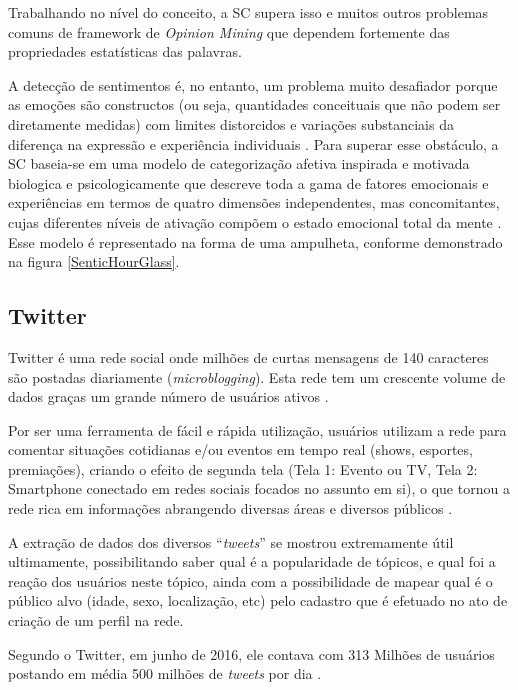 \documentclass[
	12pt,				%
	openright,			%
	oneside,			%
	a4paper,			%
	english,			%
	spanish,			%
	brazil				%
	]{abntex2}
\begin{document}
Trabalhando no nível do conceito, a \gls{SC} supera isso e muitos outros problemas comuns de framework de \emph{Opinion Mining} que dependem fortemente das propriedades estatísticas das palavras. 

A detecção de sentimentos é, no entanto, um problema muito desafiador porque as emoções são constructos (ou seja, quantidades conceituais que não podem ser diretamente medidas) com limites distorcidos e variações substanciais da diferença na expressão e experiência individuais \cite{inBook_Bisio2016} . Para superar esse obstáculo, a \gls{SC} baseia-se em uma modelo de categorização afetiva inspirada e motivada biologica e  psicologicamente que descreve toda a gama de fatores emocionais e experiências em termos de quatro dimensões independentes, mas concomitantes, cujas diferentes níveis de ativação compõem o estado emocional total da mente \cite{book_Cambria2015}. Esse modelo é representado na forma de uma ampulheta, conforme demonstrado na figura \ref{SenticHourGlass}.

	\subsection{Twitter}
	
	Twitter é uma rede social onde milhões de curtas mensagens de 140 caracteres são postadas diariamente (\emph{microblogging}). Esta rede tem um crescente volume de dados graças um grande número de usuários ativos \cite{conference_twitter_alg}.

	Por ser uma ferramenta de fácil e rápida utilização, usuários utilizam a rede para comentar situações cotidianas e/ou eventos em tempo real (shows, esportes, premiações), criando o efeito de segunda tela (Tela 1: Evento ou TV, Tela 2: Smartphone conectado em redes sociais focados no assunto em si), o que tornou a rede rica em informações abrangendo diversas áreas e diversos públicos \cite{conference_twitter_sports}.

	A extração de dados dos diversos ``\emph{tweets}'' se mostrou extremamente útil ultimamente, possibilitando saber qual é a popularidade de tópicos, e qual foi a reação dos usuários neste tópico,  ainda com a possibilidade de mapear qual é o público alvo (idade, sexo, localização, etc) pelo cadastro que é efetuado no ato de criação de um perfil na rede.

	Segundo o Twitter, em junho de 2016, ele contava com 313 Milhões de usuários \cite{twitter_company} postando em média 500 milhões de \emph{tweets} por dia \cite{TwitterU87:online}.
	
\end{document}
